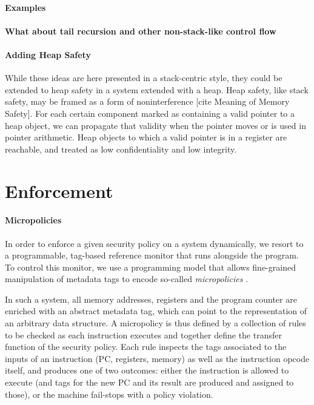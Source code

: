 \documentclass[acmsmall,review,anonymous]{acmart}\settopmatter{printfolios=true,printccs=false,printacmref=false}
\begin{document}
  \paragraph{Examples}


  \paragraph{What about tail recursion and other non-stack-like control flow}


  \paragraph{Adding Heap Safety}

    While these ideas are here presented in a stack-centric style, they could
    be extended to heap safety in a system extended with a heap. Heap safety,
    like stack safety, may be framed as a form of noninterference
    [cite Meaning of Memory Safety]. For each certain component marked as
    containing a valid pointer to a heap object, we can propagate that
    validity when the pointer moves or is used in pointer arithmetic. Heap
    objects to which a valid pointer is in a register are reachable, and
    treated as low confidentiality and low integrity.

\section{Enforcement}
\label{sec:enforcement}


\paragraph*{Micropolicies}
%
In order to enforce a given security policy on a system dynamically, we resort
to a programmable, tag-based reference monitor that runs alongside the program.
To control this monitor, we use a programming model that allows fine-grained
manipulation of metadata tags to encode so-called \emph{micropolicies}
.

In such a system, all memory addresses, registers and the program counter are
enriched with an abstract metadata tag, which can point to the representation of
an arbitrary data structure. A micropolicy is thus defined by a collection of
rules to be checked as each instruction executes and together define the
transfer function of the security policy. Each rule inspects the tags associated
to the inputs of an instruction (PC, registers, memory) as well as the
instruction opcode itself, and produces one of two outcomes: either the
instruction is allowed to execute (and tags for the new PC and its result are
produced and assigned to those), or the machine fail-stops with a policy
violation.
\end{document}
